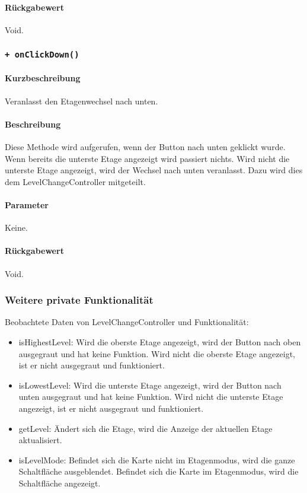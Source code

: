 \paragraph*{Rückgabewert}
Void.

\subsubsection{\texttt{+ onClickDown()}}%
\paragraph*{Kurzbeschreibung}
Veranlasst den Etagenwechsel nach unten.
\paragraph*{Beschreibung}
Diese Methode wird aufgerufen, wenn der Button nach unten geklickt wurde. \\
Wenn bereits die unterste Etage angezeigt wird passiert nichts. 
Wird nicht die unterste Etage angezeigt, wird der Wechsel nach unten veranlasst.
Dazu wird dies dem LevelChangeController mitgeteilt.
\paragraph*{Parameter}
Keine.
\paragraph*{Rückgabewert}
Void.

\subsubsection{Weitere private Funktionalität}%
Beobachtete Daten von LevelChangeController und Funktionalität:
\begin{itemize}
    \item isHighestLevel: Wird die oberste Etage angezeigt, wird der Button nach oben ausgegraut 
    und hat keine Funktion. Wird nicht die oberste Etage angezeigt, ist er nicht ausgegraut und funktioniert.
    \item isLowestLevel: Wird die unterste Etage angezeigt, wird der Button nach unten ausgegraut 
    und hat keine Funktion. Wird nicht die unterste Etage angezeigt, ist er nicht ausgegraut und funktioniert.
    \item getLevel: Ändert sich die Etage, wird die Anzeige der aktuellen Etage aktualisiert.
    \item isLevelMode: Befindet sich die Karte nicht im Etagenmodus, wird die ganze Schaltfläche ausgeblendet.
    Befindet sich die Karte im Etagenmodus, wird die Schaltfläche angezeigt.
\end{itemize}
